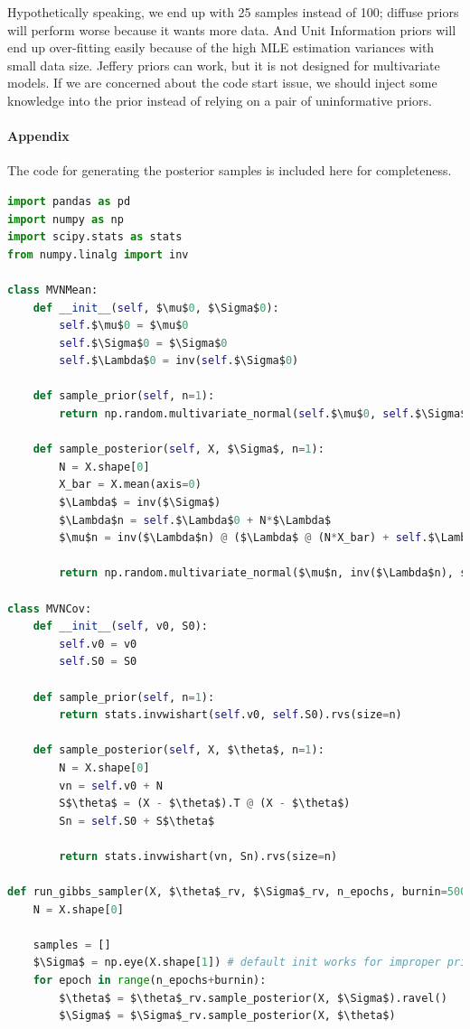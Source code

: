 \documentclass[11pt, letterpaper]{article}
\begin{document}
Hypothetically speaking, we end up with 25 samples instead of 100; diffuse priors will perform worse because it wants more data. And Unit Information priors will end up over-fitting easily because of the high MLE estimation variances with small data size. Jeffery priors can work, but it is not designed for multivariate models. If we are concerned about the code start issue, we should inject some knowledge into the prior instead of relying on a pair of uninformative priors.

\paragraph{Appendix}
The code for generating the posterior samples is included here for completeness.
\begin{lstlisting}[language=Python]
import pandas as pd
import numpy as np
import scipy.stats as stats
from numpy.linalg import inv

class MVNMean:
    def __init__(self, $\mu$0, $\Sigma$0):
        self.$\mu$0 = $\mu$0
        self.$\Sigma$0 = $\Sigma$0
        self.$\Lambda$0 = inv(self.$\Sigma$0)
    
    def sample_prior(self, n=1):
        return np.random.multivariate_normal(self.$\mu$0, self.$\Sigma$0, size=n)
    
    def sample_posterior(self, X, $\Sigma$, n=1):
        N = X.shape[0]
        X_bar = X.mean(axis=0)
        $\Lambda$ = inv($\Sigma$)
        $\Lambda$n = self.$\Lambda$0 + N*$\Lambda$
        $\mu$n = inv($\Lambda$n) @ ($\Lambda$ @ (N*X_bar) + self.$\Lambda$0 @ self.$\mu$0)

        return np.random.multivariate_normal($\mu$n, inv($\Lambda$n), size=n)

class MVNCov:
    def __init__(self, v0, S0):
        self.v0 = v0
        self.S0 = S0
    
    def sample_prior(self, n=1):
        return stats.invwishart(self.v0, self.S0).rvs(size=n)
    
    def sample_posterior(self, X, $\theta$, n=1):
        N = X.shape[0]
        vn = self.v0 + N
        S$\theta$ = (X - $\theta$).T @ (X - $\theta$)
        Sn = self.S0 + S$\theta$

        return stats.invwishart(vn, Sn).rvs(size=n)

def run_gibbs_sampler(X, $\theta$_rv, $\Sigma$_rv, n_epochs, burnin=500):
    N = X.shape[0]

    samples = []
    $\Sigma$ = np.eye(X.shape[1]) # default init works for improper priors
    for epoch in range(n_epochs+burnin):
        $\theta$ = $\theta$_rv.sample_posterior(X, $\Sigma$).ravel()
        $\Sigma$ = $\Sigma$_rv.sample_posterior(X, $\theta$)


\end{lstlisting}
\end{document}
